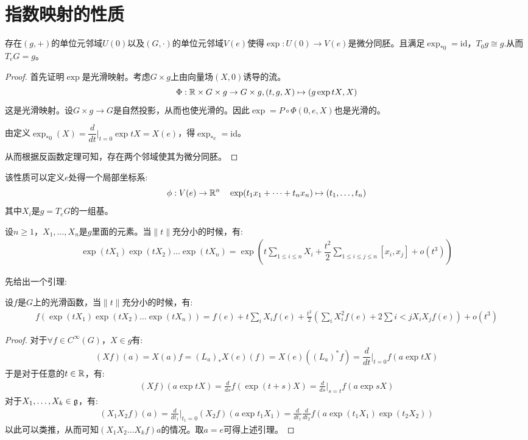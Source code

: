 \section{指数映射的性质}
\begin{proposition}
    存在$(g,+)$的单位元邻域$U(0)$以及$(G,\cdot)$的单位元邻域$V(e)$使得$\exp:U(0) \to V(e)$是微分同胚。且满足$\exp_{*0}=\mathrm{id}$，$T_0g\cong g$.从而$T_eG =g$。
\end{proposition}
\begin{proof}
    首先证明$\exp$是光滑映射。考虑$G \times g$上由向量场$(X,0)$诱导的流。
    $$
    \Phi:\mathbb{R} \times G \times g \to G \times g, (t,g,X)\mapsto (g \exp{tX},X)
    $$
    这是光滑映射。设$G \times g \to G$是自然投影，从而也使光滑的。因此$\exp=P\circ \Phi(0,e,X)$也是光滑的。

    由定义$\exp_{*0}(X)=\dfrac{d}{dt}|_{t=0} \exp{tX}=X(e)$，得$\exp_{*e}=\mathrm{id}$。

    从而根据反函数定理可知，存在两个邻域使其为微分同胚。
\end{proof}
\begin{remark}
    该性质可以定义$e$处得一个局部坐标系:
    $$
    \phi:V(e) \to \mathbb{R}^n \quad \exp(t_1x_1+\dots+t_nx_n)\mapsto (t_1,\dots,t_n)
    $$
    其中$X_i$是$g=T_e G$的一组基。
\end{remark}
\begin{proposition}\label{pro:extension}
    设$n \geq 1$，$X_1,\dots,X_n$是$g$里面的元素。当$\|t\|$充分小的时候，有:
    \begin{align}
        \exp(tX_1)\exp(tX_2)\dots \exp(tX_n)=\exp(t\sum_{1\leq i \leq n}X_i+\dfrac{t^2}{2}\sum_{1\leq i \leq j\leq n}[x_i,x_j]+o(t^3))
    \end{align}
\end{proposition}
先给出一个引理:
\begin{lemma}
    设$f$是$G$上的光滑函数，当$\|t\|$充分小的时候，有:
    \begin{align}
        f( \exp(tX_1)\exp(tX_2)\dots \exp(tX_n))=f(e)+t\sum_{i}X_if(e)+\frac{t^2}{2}(\sum_i X_i^2f(e)+2\sum{i<j}X_iX_jf(e))+o(t^3)
    \end{align}
\end{lemma}
\begin{proof}
    对于$\forall f \in C^\infty(G)$，$X \in g$有:
    \begin{align}
        (Xf)(a)=X(a)f=(L_a)_*X(e)(f)=X(e)((L_a)^*f)=\dfrac{d}{dt}|_{t=0}f(a\exp{tX})
    \end{align}
    于是对于任意的$t \in \mathbb{R}$，有:
    \begin{align}
        (Xf)(a\exp tX)=\frac{d}{ds}f(\exp(t+s)X)=\frac{d}{ds}|_{s=t}f(a\exp sX)
    \end{align}
    对于$X_1,\dots,X_k \in \mathfrak{g}$，有:
    \begin{align}
        (X_1X_2f)(a)=\frac{d}{dt_1}|_{t_1=0}(X_2f)(a\exp t_1X_1)=\frac{d}{dt_1}\frac{d}{dt_2}f(a\exp(t_1X_1)\exp(t_2X_2))
    \end{align}
    以此可以类推，从而可知$(X_1X_2\dots X_k f)a$的情况。取$a=e$可得上述引理。
\end{proof}
